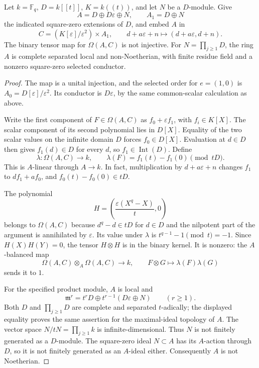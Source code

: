 \begin{proposition}\label{prop:nonnoetherian-nilpotent-conductor}
Let $k=\mathbb F_q$, $D=k[[t]]$, $K=k((t))$, and let $N$ be a
$D$-module.  Give
\[
 A=D\oplus D\varepsilon\oplus N,
 \qquad A_1=D\oplus N
\]
the indicated square-zero extensions of $D$, and embed $A$ in
\[
 C=(K[\varepsilon]/\varepsilon^2)\times A_1,
 \qquad
 d+a\varepsilon+n\longmapsto(d+a\varepsilon,d+n).
\]
The binary tensor map for $\Omega(A,C)$ is not injective.
For $N=\prod_{j\ge1}D$, the ring $A$ is complete separated local
and non-Noetherian, with finite residue field and a nonzero
square-zero selected conductor.
\end{proposition}
\begin{proof}
The map is a unital injection, and the selected order for $e=(1,0)$
is $A_0=D[\varepsilon]/\varepsilon^2$.  Its conductor is
$D\varepsilon$, by the same common-scalar calculation as above.

Write the first component of $F\in\Omega(A,C)$ as
$f_0+\varepsilon f_1$, with $f_i\in K[X]$.
The scalar component of its second polynomial lies in $D[X]$.
Equality of the two scalar values on the infinite domain $D$
forces $f_0\in D[X]$.  Evaluation at $d\in D$ then gives
$f_1(d)\in D$ for every $d$, so $f_1\in\operatorname{Int}(D)$.
Define
\[
 \lambda:\Omega(A,C)\longrightarrow k,
 \qquad \lambda(F)=f_1(t)-f_1(0)\pmod {tD}.
\]
This is $A$-linear through $A\to k$.  In fact, multiplication by
$d+a\varepsilon+n$ changes $f_1$ to $df_1+af_0$, and
$f_0(t)-f_0(0)\in tD$.

The polynomial
\[
 H=\left(\frac{\varepsilon(X^q-X)}t,0\right)
\]
belongs to $\Omega(A,C)$ because $d^q-d\in tD$ for $d\in D$
and the nilpotent part of the argument is annihilated by
$\varepsilon$.  Its value under $\lambda$ is
$t^{q-1}-1\pmod t=-1$.
Since $H(X)H(Y)=0$, the tensor $H\otimes H$ is in the binary
kernel.  It is nonzero: the $A$-balanced map
\[
 \Omega(A,C)\otimes_A\Omega(A,C)\longrightarrow k,
 \qquad F\otimes G\longmapsto\lambda(F)\lambda(G)
\]
sends it to $1$.

For the specified product module, $A$ is local and
\[
 \mathfrak m^r=t^rD\oplus t^{r-1}(D\varepsilon\oplus N)
 \qquad(r\ge1).
\]
Both $D$ and $\prod_{j\ge1}D$ are complete and separated
$t$-adically; the displayed equality proves the same assertion
for the maximal-ideal topology of $A$.
The vector space $N/tN=\prod_{j\ge1}k$ is infinite-dimensional.
Thus $N$ is not finitely generated as a $D$-module.  The
square-zero ideal $N\subset A$ has its $A$-action through $D$,
so it is not finitely generated as an $A$-ideal either.
Consequently $A$ is not Noetherian.
\end{proof}
